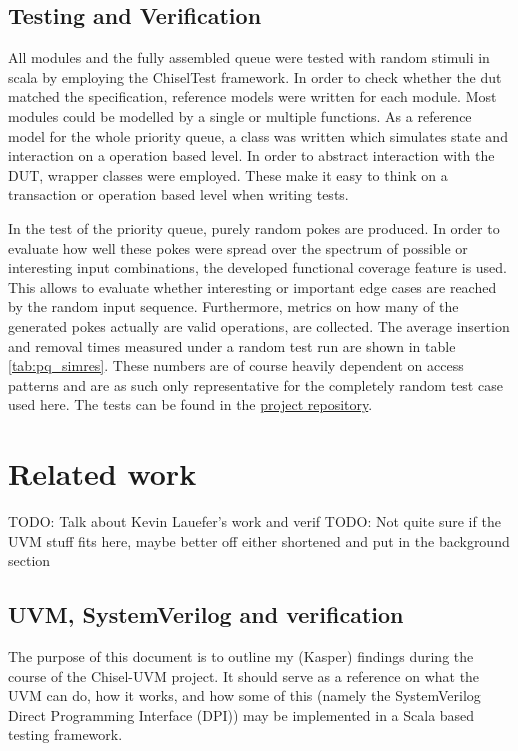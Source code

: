 \documentclass[conference]{IEEEtran}
\newcommand{\todo}[1]{{\color{olive} TODO: #1}}
\begin{document}
\subsection{Testing and Verification}

All modules and the fully assembled queue were tested with random stimuli in scala by employing the ChiselTest framework.
In order to check whether the dut matched the specification, reference models were written for each module. Most modules 
could be modelled by a single or multiple functions. As a reference model for the whole priority queue, a class 
was written which simulates state and interaction on a operation based level. In order to abstract interaction with the DUT,
wrapper classes were employed. These make it easy to think on a transaction or 
operation based level when writing tests.

In the test of the priority queue, purely random pokes are produced. In order to evaluate how well these pokes were spread over the spectrum 
of possible or interesting input combinations, the developed functional coverage feature is used. This allows to evaluate whether interesting 
or important edge cases are reached by the random input sequence. Furthermore, metrics on how many of the generated pokes actually are valid 
operations, are collected. The average insertion and removal times measured under a random test run are shown in table \ref{tab:pq_simres}.
These numbers are of course heavily dependent on access patterns and are as such only representative for the completely random test case used here.
The tests can be found in the \href{https://github.com/chisel-uvm/chisel-verify/tree/master/src/test/scala/heappriorityqueue}{project repository}.

\section{Related work}

\todo{Talk about Kevin Lauefer's work and verif}
\todo{Not quite sure if the UVM stuff fits here, maybe better off either shortened and put in the background section}
\subsection{UVM, SystemVerilog and verification} 
The purpose of this document is to outline my (Kasper) findings during the course of the Chisel-UVM project. It should serve as a reference on what the UVM can do, how it works, and how some of this (namely the SystemVerilog Direct Programming Interface (DPI)) may be implemented in a Scala based testing framework.
\end{document}
